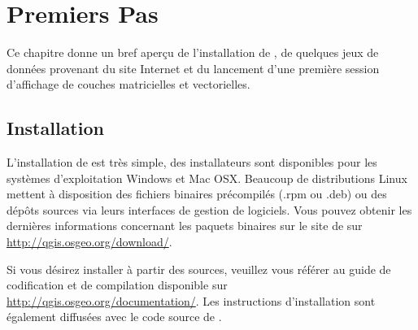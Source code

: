 
\chapter{Premiers Pas}\label{label_getstarted}



Ce chapitre donne un bref aperçu de l'installation de \qg, de quelques jeux de données provenant du site Internet et du lancement d'une première session d'affichage de couches matricielles et vectorielles.

\section{Installation}\label{label_installation}


L'installation de \qg est très simple, des installateurs sont disponibles pour les systèmes d'exploitation Windows et Mac OSX. Beaucoup de distributions Linux mettent à disposition des fichiers binaires précompilés (.rpm ou .deb) ou des dépôts sources via leurs interfaces de gestion de logiciels. Vous pouvez obtenir les dernières informations concernant les paquets binaires sur le site de \qg sur \url{http://qgis.osgeo.org/download/}.




Si vous désirez installer \qg à  partir des sources, veuillez vous référer au guide de codification et de compilation disponible sur \url{http://qgis.osgeo.org/documentation/}.
Les instructions d'installation sont également diffusées avec le code source de \qg.

